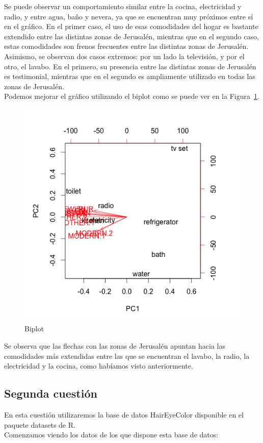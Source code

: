 \documentclass[12pt,a4paper,twoside,openright,titlepage,final]{article}
\begin{document}
Se puede observar un comportamiento similar entre la cocina, electricidad y radio, y entre agua, baño y nevera, ya que se encuentran muy próximos entre sí en el gráfico. En el primer caso, el uso de esas comodidades del hogar es bastante extendido entre las distintas zonas de Jerusalén, mientras que en el segundo caso, estas comodidades son frenos frecuentes entre las distintas zonas de Jerusalén.\\
Asimismo, se observan dos casos extremos: por un lado la televisión, y por el otro, el lavabo. En el primero, su presencia entre las distintas zonas de Jerusalén es testimonial, mientras que en el segundo es ampliamente utilizado en todas las zonas de Jerusalén.\\

Podemos mejorar el gráfico utilizando el biplot como se puede ver en la Figura~\ref{fig:biplot}.\\

\begin{figure}[tbph!]
\centering
\includegraphics[width=0.5\linewidth]{imagenes/biplot}
\caption{Biplot}
\label{fig:biplot}
\end{figure}

Se observa que las flechas con las zonas de Jerusalén apuntan hacia las comodidades más extendidas entre las que se encuentran el lavabo, la radio, la electricidad y la cocina, como habíamos visto anteriormente.\\

\subsection{Segunda cuestión}
En esta cuestión utilizaremos la base de datos HairEyeColor disponible en el paquete datasets de R.\\

Comenzamos viendo los datos de los que dispone esta base de datos:
\end{document}
